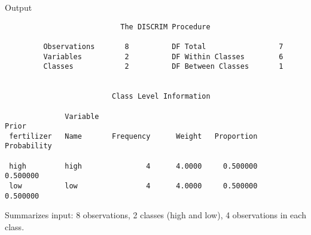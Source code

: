 \documentclass[pdf]{prosper}
\begin{document}
\begin{slide}{Output}

{\scriptsize
\begin{verbatim}
                           The DISCRIM Procedure

         Observations       8          DF Total                 7
         Variables          2          DF Within Classes        6
         Classes            2          DF Between Classes       1


                         Class Level Information
 
              Variable                                              Prior
 fertilizer   Name       Frequency      Weight   Proportion   Probability

 high         high               4      4.0000     0.500000      0.500000
 low          low                4      4.0000     0.500000      0.500000

\end{verbatim}
}

Summarizes input: 8 observations, 2 classes (high and low), 4 observations in each class.
  
\end{slide}
\end{document}
